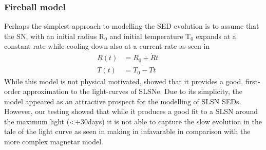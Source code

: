 \subsubsection{Fireball model}
Perhaps the simplest approach to modelling the SED evolution is to assume that the SN, with an initial radius R$_{0}$ and initial temperature T$_{0}$ expands at a constant rate while cooling down also at a current rate as seen in 
\begin{align}
\label{eq:Howell}
R(t) &= R_0 + \dot{R}t &&\\
T(t) &= T_0 - \dot{T}t &&
\end{align}
\noindent While this model is not physical motivated, \citet{Howell2013} showed that it provides a good, first-order approximation to the light-curves of SLSNe. Due to its simplicity, the model appeared as an attractive prospect for the modelling of SLSN SEDs. However, our testing showed that while it produces a good fit to a SLSN around the maximum light (<+30days) it is not able to capture the slow evolution in the tale of the light curve as seen in  making in infavarable in comparison with the more complex magnetar model.

